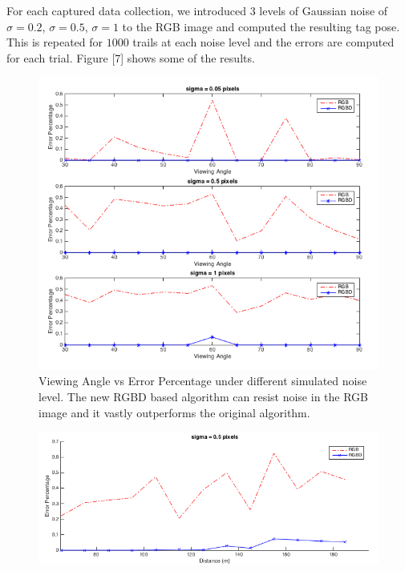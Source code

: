 For each captured data collection, we introduced 3 levels of Gaussian noise of $\sigma = 0.2$, $\sigma = 0.5$, $\sigma = 1$  to the RGB image and computed the resulting tag pose. This is repeated for $1000$ trails at each noise level and the errors are computed for each trial. Figure [7] shows some of the results. 
\begin{figure}
\centering
\includegraphics[width=\columnwidth]{figs/viewing_angle_fig1}
\caption{Viewing Angle vs Error Percentage under different simulated noise level. The new RGBD based algorithm can resist noise in the RGB image and it vastly outperforms the original algorithm.}
\end{figure}

\begin{figure}
\centering
\includegraphics[width=\columnwidth]{figs/distance_fig1}
\end{figure}

